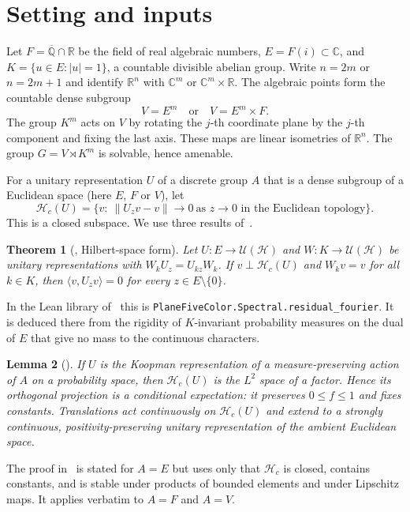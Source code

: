 \documentclass[11pt]{amsart}
\newtheorem{theorem}{Theorem}[section]
\newtheorem{lemma}[theorem]{Lemma}
\theoremstyle{definition}
\newcommand{\R}{\mathbb{R}}
\newcommand{\C}{\mathbb{C}}
\newcommand{\Q}{\mathbb{Q}}
\newcommand{\cH}{\mathcal{H}}
\begin{document}
\section{Setting and inputs}\label{sec:setting}

Let $F=\overline{\Q}\cap\R$ be the field of real algebraic numbers, $E=F(i)\subset\C$, and $K=\{u\in E:|u|=1\}$, a countable divisible abelian group. Write $n=2m$ or $n=2m+1$ and identify $\R^n$ with $\C^m$ or $\C^m\times\R$. The algebraic points form the countable dense subgroup
\[
V=E^m\quad\text{or}\quad V=E^m\times F .
\]
The group $K^m$ acts on $V$ by rotating the $j$-th coordinate plane by the $j$-th component and fixing the last axis. These maps are linear isometries of $\R^n$. The group $G=V\rtimes K^m$ is solvable, hence amenable.

For a unitary representation $U$ of a discrete group $A$ that is a dense subgroup of a Euclidean space (here $E$, $F$ or $V$), let
\[
\cH_c(U)=\{v:\ \|U_zv-v\|\to0\ \text{as }z\to0\text{ in the Euclidean topology}\}.
\]
This is a closed subspace. We use three results of~\cite{OAI}.

\begin{theorem}[{\cite[Theorem 2.3]{OAI}}, Hilbert-space form]\label{thm:rigidity}
Let $U\colon E\to\mathcal U(\cH)$ and $W\colon K\to\mathcal U(\cH)$ be unitary representations with $W_kU_z=U_{kz}W_k$. If $v\perp\cH_c(U)$ and $W_kv=v$ for all $k\in K$, then $\langle v,U_zv\rangle=0$ for every $z\in E\setminus\{0\}$.
\end{theorem}

In the Lean library of~\cite{OAI} this is \texttt{PlaneFiveColor.Spectral.residual\_fourier}. It is deduced there from the rigidity of $K$-invariant probability measures on the dual of $E$ that give no mass to the continuous characters.

\begin{lemma}[{\cite[Lemma 4.1]{OAI}}]\label{lem:factor}
If $U$ is the Koopman representation of a measure-preserving action of $A$ on a probability space, then $\cH_c(U)$ is the $L^2$ space of a factor. Hence its orthogonal projection is a conditional expectation: it preserves $0\le f\le1$ and fixes constants. Translations act continuously on $\cH_c(U)$ and extend to a strongly continuous, positivity-preserving unitary representation of the ambient Euclidean space.
\end{lemma}

The proof in~\cite{OAI} is stated for $A=E$ but uses only that $\cH_c$ is closed, contains constants, and is stable under products of bounded elements and under Lipschitz maps. It applies verbatim to $A=F$ and $A=V$.
\end{document}
